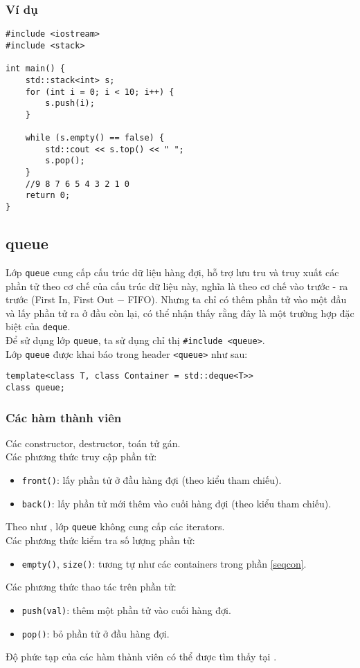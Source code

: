 \subsubsection{Ví dụ}
\begin{lstlisting}
#include <iostream>
#include <stack>

int main() {
    std::stack<int> s;
    for (int i = 0; i < 10; i++) {
        s.push(i); 
    }
    
    while (s.empty() == false) {
        std::cout << s.top() << " ";
        s.pop();
    }
    //9 8 7 6 5 4 3 2 1 0
    return 0;
}
\end{lstlisting}
\subsection{queue}
Lớp \lstinline{queue} cung cấp cấu trúc dữ liệu hàng đợi, hỗ trợ lưu tru và truy xuất các phần tử theo cơ chế của cấu trúc dữ liệu này, nghĩa là theo cơ chế vào trước - ra trước (First In, First Out $-$ FIFO). Nhưng ta chỉ có thêm phần tử vào một đầu và lấy phần tử ra ở đầu còn lại, có thể nhận thấy rằng đây là một trường hợp đặc biệt của \lstinline{deque}.\\
Để sử dụng lớp \lstinline{queue}, ta sử dụng chỉ thị \lstinline{#include <queue>}.\\
Lớp \lstinline{queue} được khai báo trong header \lstinline{<queue>} như sau: \cite{queue}
\begin{lstlisting}
template<class T, class Container = std::deque<T>> 
class queue;
\end{lstlisting}
\subsubsection{Các hàm thành viên}
Các constructor, destructor, toán tử gán.\\
Các phương thức truy cập phần tử:
\begin{itemize}
    \item \lstinline{front()}: lấy phần tử ở đầu hàng đợi (theo kiểu tham chiếu).
    \item \lstinline{back()}: lấy phần tử mới thêm vào cuối hàng đợi (theo kiểu tham chiếu).
\end{itemize}
Theo như \cite{queue}, lớp \lstinline{queue} không cung cấp các iterators.\\
Các phương thức kiểm tra số lượng phần tử:
\begin{itemize}
    \item \lstinline{empty()}, \lstinline{size()}: tương tự như các containers trong phần \ref{seqcon}.
\end{itemize}
Các phương thức thao tác trên phần tử:
\begin{itemize}
    \item \lstinline{push(val)}: thêm một phần tử vào cuối hàng đợi.
    \item \lstinline{pop()}: bỏ phần tử ở đầu hàng đợi.
\end{itemize}
Độ phức tạp của các hàm thành viên có thể được tìm thấy tại \cite{queue}.
